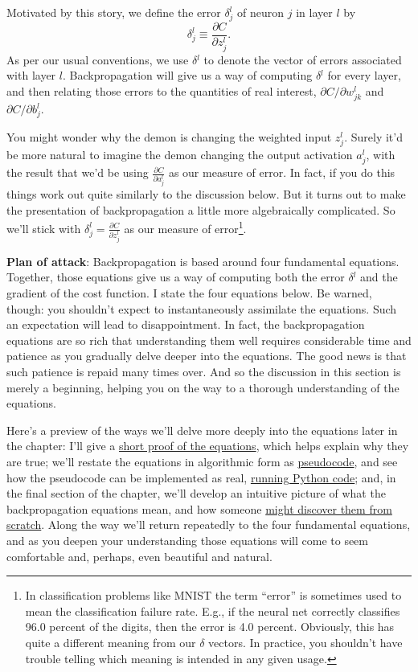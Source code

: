 \documentclass[a4paper,twoside,10pt]{book}
\begin{document}
Motivated by this story, we define the error $\delta^l_j$ of neuron $j$ in layer $l$ by
\begin{equation}
	\delta^l_j\equiv\frac{\partial{}C}{\partial{}z^l_j}.\tag{29}\label{eq:29}
\end{equation}
As per our usual conventions, we use $\delta{}^l$ to denote the vector of errors associated with layer $l$. Backpropagation will give us a way of computing $\delta{}^l$ for every layer, and then relating those errors to the quantities of real interest, $\partial{}C/\partial{}w^l_{jk}$ and $\partial{}C/\partial{}b^l_j$.

You might wonder why the demon is changing the weighted input $z^l_j$. Surely it'd be more natural to imagine the demon changing the output activation $a^l_j$, with the result that we'd be using $\frac{\partial{}C}{\partial{}a^l_j}$ as our measure of error. In fact, if you do this things work out quite similarly to the discussion below. But it turns out to make the presentation of backpropagation a little more algebraically complicated. So we'll stick with $\delta^l_j=\frac{\partial{}C}{\partial{}z^l_j}$ as our measure of error\footnote{In classification problems like MNIST the term ``error'' is sometimes used to mean the classification failure rate. E.g., if the neural net correctly classifies 96.0 percent of the digits, then the error is 4.0 percent. Obviously, this has quite a different meaning from our $\delta$ vectors. In practice, you shouldn't have trouble telling which meaning is intended in any given usage.}.

\textbf{Plan of attack}: Backpropagation is based around four fundamental equations. Together, those equations give us a way of computing both the error $\delta{}^l$ and the gradient of the cost function. I state the four equations below. Be warned, though: you shouldn't expect to instantaneously assimilate the equations. Such an expectation will lead to disappointment. In fact, the backpropagation equations are so rich that understanding them well requires considerable time and patience as you gradually delve deeper into the equations. The good news is that such patience is repaid many times over. And so the discussion in this section is merely a beginning, helping you on the way to a thorough understanding of the equations.

Here's a preview of the ways we'll delve more deeply into the equations later in the chapter: I'll give a \hyperref[sec:2.5]{short proof of the equations}, which helps explain why they are true; we'll restate the equations in algorithmic form as \hyperref[sec:2.6]{pseudocode}, and see how the pseudocode can be implemented as real, \hyperref[sec:2.7]{running Python code}; and, in the final section of the chapter, we'll develop an intuitive picture of what the backpropagation equations mean, and how someone \hyperref[sec:2.9]{might discover them from scratch}. Along the way we'll return repeatedly to the four fundamental equations, and as you deepen your understanding those equations will come to seem comfortable and, perhaps, even beautiful and natural.
\end{document}
